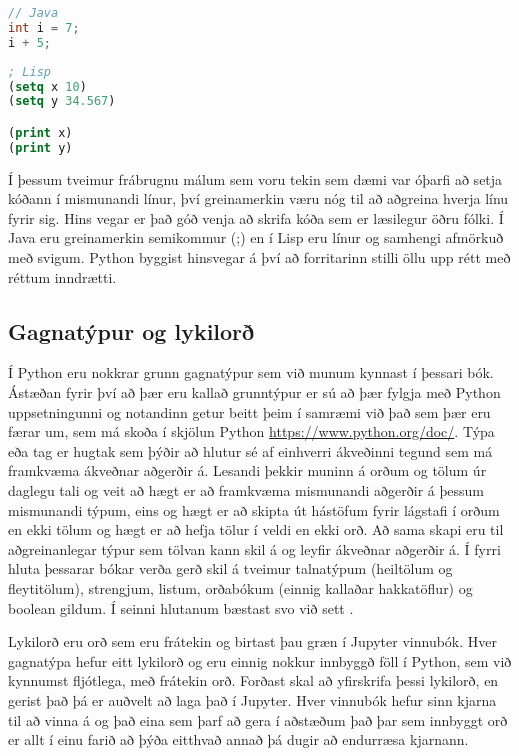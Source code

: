 \documentclass[11pt,fleqn]{book} %
\begin{document}
\begin{lstlisting}[language=Java , caption=Dæmi um annað mál sem er strangt tagað og með greinamerkjum]
// Java
int i = 7;
i + 5;
\end{lstlisting}

\begin{lstlisting}[language=Lisp, caption=Dæmi um annað mál sem byggir á afmörkuðu samhengi en með greinamerkjum]
; Lisp
(setq x 10)
(setq y 34.567)

(print x)
(print y)
\end{lstlisting}

Í þessum tveimur frábrugnu málum sem voru tekin sem dæmi var óþarfi að setja kóðann í mismunandi línur, því greinamerkin væru nóg til að aðgreina hverja línu fyrir sig. 
Hins vegar er það góð venja að skrifa kóða sem er læsilegur öðru fólki. Í Java eru greinamerkin semikommur (;) en í Lisp eru línur og samhengi afmörkuð með svigum. 
Python byggist hinsvegar á því að forritarinn stilli öllu upp rétt með réttum inndrætti. 

\subsection{Gagnatýpur og lykilorð}

Í Python eru nokkrar grunn gagnatýpur sem við munum kynnast í þessari bók. 
Ástæðan fyrir því að þær eru kallað grunntýpur er sú að þær fylgja með Python uppsetningunni og notandinn getur beitt þeim í samræmi við það sem þær eru færar um, sem má skoða í skjölun Python \href{https://www.python.org/doc/}{https://www.python.org/doc/}. 
Týpa eða tag er hugtak sem þýðir að hlutur sé af einhverri ákveðinni tegund sem má framkvæma ákveðnar aðgerðir á. 
Lesandi þekkir muninn á orðum og tölum úr daglegu tali og veit að hægt er að framkvæma mismunandi aðgerðir á þessum mismunandi týpum, eins og hægt er að skipta út hástöfum fyrir lágstafi í orðum en ekki tölum og hægt er að hefja tölur í veldi en ekki orð. 
Að sama skapi eru til aðgreinanlegar týpur sem tölvan kann skil á og leyfir ákveðnar aðgerðir á.
Í fyrri hluta þessarar bókar verða gerð skil á tveimur talnatýpum (heiltölum og fleytitölum), strengjum, listum, orðabókum (einnig kallaðar hakkatöflur) og boolean gildum. 
Í seinni hlutanum bæstast svo við sett .

Lykilorð eru orð sem eru frátekin og birtast þau græn í Jupyter vinnubók. 
Hver gagnatýpa hefur eitt lykilorð og eru einnig nokkur innbyggð föll í Python, sem við kynnumst fljótlega, með frátekin orð. 
Forðast skal að yfirskrifa þessi lykilorð, en gerist það þá er auðvelt að laga það í Jupyter. 
Hver vinnubók hefur sinn kjarna til að vinna á og það eina sem þarf að gera í aðstæðum það þar sem innbyggt orð er allt í einu farið að þýða eitthvað annað þá dugir að endurræsa kjarnann. 
\end{document}
